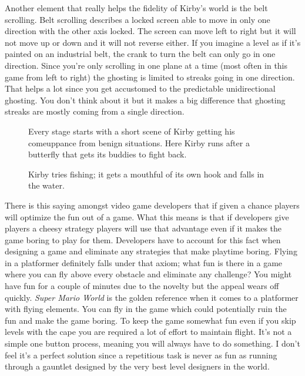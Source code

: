 \documentclass{book}
\begin{document}
\FloatBarrier\vspace{\baselineskip}\begin{figure}[H]\end{figure}
Another element that really helps the fidelity of Kirby’s world is the belt scrolling. Belt scrolling describes a locked screen able to move in only one direction with the other axis locked. The screen can move left to right but it will not move up or down and it will not reverse either. If you imagine a level as if it’s painted on an industrial belt, the crank to turn the belt can only go in one direction. Since you’re only scrolling in one plane at a time (most often in this game from left to right) the ghosting is limited to streaks going in one direction. That helps a lot since you get accustomed to the predictable unidirectional ghosting. You don’t think about it but it makes a big difference that ghosting streaks are mostly coming from a single direction.\par
\FloatBarrier\vspace{\baselineskip}\begin{figure}[H]\caption*{Every stage starts with a short scene of Kirby getting his comeuppance from benign situations. Here Kirby runs after a butterfly that gets its buddies to fight back.}\end{figure}
\FloatBarrier\vspace{\baselineskip}\begin{figure}[H]\caption*{Kirby tries fishing; it gets a mouthful of its own hook and falls in the water.}\end{figure}
There is this saying amongst video game developers that if given a chance players will optimize the fun out of a game. What this means is that if developers give players a cheesy strategy players will use that advantage even if it makes the game boring to play for them. Developers have to account for this fact when designing a game and eliminate any strategies that make playtime boring. Flying in a platformer definitely falls under that axiom; what fun is there in a game where you can fly above every obstacle and eliminate any challenge? You might have fun for a couple of minutes due to the novelty but the appeal wears off quickly. \emph{Super Mario World} is the golden reference when it comes to a platformer with flying elements. You can fly in the game which could potentially ruin the fun and make the game boring. To keep the game somewhat fun even if you skip levels with the cape you are required a lot of effort to maintain flight. It’s not a simple one button process, meaning you will always have to do something. I don’t feel it’s a perfect solution since a repetitious task is never as fun as running through a gauntlet designed by the very best level designers in the world.\par
\end{document}
